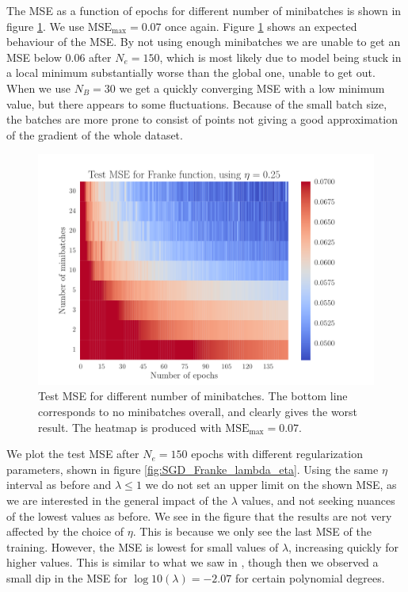 \documentclass[12pt]{extarticle}
\begin{document}
The MSE as a function of epochs for different number of minibatches is shown in figure \ref{fig:SGD_Franke_epochs_minibatches}. We use $\mathrm{MSE}_\mathrm{max}=0.07$ once again.
Figure \ref{fig:SGD_Franke_epochs_minibatches} shows an expected behaviour of the MSE. By not using enough minibatches we are unable to get an MSE below $0.06$ after $N_e=150$, which is most likely due to model being stuck in a local minimum substantially worse than the global one, unable to get out. When we use $N_B=30$ we get a quickly converging MSE with a low minimum value, but there appears to some fluctuations. Because of the small batch size, the batches are more prone to consist of points not giving a good approximation of the gradient of the whole dataset.

\begin{figure}[h!]
	\includegraphics[width=0.9\linewidth]{SGD_Franke/reg_Franke__epochs_minibatches__Test_MSE__440533.pdf}
	\caption{Test MSE for different number of minibatches. The bottom line corresponds to no minibatches overall, and clearly gives the worst result. The heatmap is produced with $\mathrm{MSE}_\mathrm{max}=0.07$.}
	\label{fig:SGD_Franke_epochs_minibatches}
\end{figure}


We plot the test MSE after $N_e=150$ epochs with different regularization parameters, shown in figure \ref{fig:SGD_Franke_lambda_eta}. Using the same $\eta$ interval as before and $\lambda\leq1$ we do not set an upper limit on the shown MSE, as we are interested in the general impact of the $\lambda$ values, and not seeking nuances of the lowest values as before.
We see in the figure that the results are not very affected by the choice of $\eta$. This is because we only see the last MSE of the training. However, the MSE is lowest for small values of $\lambda$, increasing quickly for higher values. This is similar to what we saw in \cite{project1}, though then we observed a small dip in the MSE for $\log10(\lambda)=-2.07$ for certain polynomial degrees.
\end{document}
